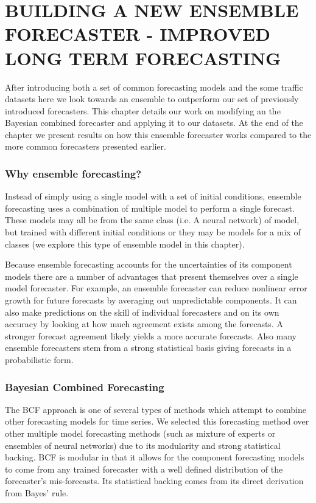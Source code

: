 \chapter{BUILDING A NEW ENSEMBLE FORECASTER - IMPROVED LONG TERM FORECASTING}
\label{ch:BCF}
After introducing both a set of common forecasting models and the some traffic datasets here we look towards an ensemble to outperform our set of previously introduced forecasters.  This chapter details our work on modifying an the Bayesian combined forecaster and applying it to our datasets.  At the end of the chapter we present results on how this ensemble forecaster works compared to the more common forecasters presented earlier.  

\subsection{Why ensemble forecasting?}
Instead of simply using a single model with a set of initial conditions, ensemble forecasting uses a combination of multiple model to perform a single forecast.  These models may all be from the same class (i.e. A neural network) of model, but trained with different initial conditions or they may be models for a mix of classes (we explore this type of ensemble model in this chapter).  

Because ensemble forecasting accounts for the uncertainties of its component models there are a number of advantages that present themselves over a single model forecaster.  For example, \cite{Tracton1993, Zhang2010} an ensemble forecaster can reduce nonlinear error growth for future forecasts by averaging out unpredictable components.  It can also make predictions on the skill of individual forecasters and on its own accuracy by looking at how much agreement exists among the forecasts.  A stronger forecast agreement likely yields a more accurate forecasts.  Also many ensemble forecasters stem from a strong statistical basis giving forecasts in a probabilistic form.

\subsection{Bayesian Combined Forecasting}
The BCF approach \cite{Petridis2001} is one of several types of methods which attempt to combine other forecasting models for time series. We selected this forecasting method over other multiple model forecasting methods (such as mixture of experts or ensembles of neural networks) due to its modularity and strong statistical backing.  BCF is modular in that it allows for the component forecasting models to come from any trained forecaster with a well defined distribution of the forecaster's mis-forecasts.  Its statistical backing comes from its direct derivation from Bayes' rule.

